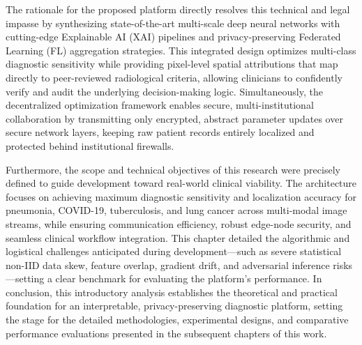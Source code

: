 The rationale for the proposed platform directly resolves this technical and legal impasse by synthesizing state-of-the-art multi-scale deep neural networks with cutting-edge Explainable AI (XAI) pipelines and privacy-preserving Federated Learning (FL) aggregation strategies. This integrated design optimizes multi-class diagnostic sensitivity while providing pixel-level spatial attributions that map directly to peer-reviewed radiological criteria, allowing clinicians to confidently verify and audit the underlying decision-making logic. Simultaneously, the decentralized optimization framework enables secure, multi-institutional collaboration by transmitting only encrypted, abstract parameter updates over secure network layers, keeping raw patient records entirely localized and protected behind institutional firewalls.

Furthermore, the scope and technical objectives of this research were precisely defined to guide development toward real-world clinical viability. The architecture focuses on achieving maximum diagnostic sensitivity and localization accuracy for pneumonia, COVID-19, tuberculosis, and lung cancer across multi-modal image streams, while ensuring communication efficiency, robust edge-node security, and seamless clinical workflow integration. This chapter detailed the algorithmic and logistical challenges anticipated during development—such as severe statistical non-IID data skew, feature overlap, gradient drift, and adversarial inference risks—setting a clear benchmark for evaluating the platform's performance. In conclusion, this introductory analysis establishes the theoretical and practical foundation for an interpretable, privacy-preserving diagnostic platform, setting the stage for the detailed methodologies, experimental designs, and comparative performance evaluations presented in the subsequent chapters of this work.
\newpage